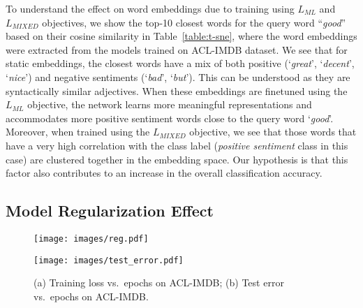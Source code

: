 \documentclass[letterpaper]{article}
\begin{document}
To understand the effect on word embeddings due to training using $L_{\textit{ML}}$ and $L_{\textit{MIXED}}$ objectives, we show the top-10 closest words for the query word ``\emph{good}'' based on their cosine similarity in Table~\ref{table:t-sne}, where the word embeddings were extracted from the models trained on ACL-IMDB dataset. We see that for static embeddings, the closest words have a mix of both positive (`\emph{great}', `\emph{decent}', `\emph{nice}') and negative sentiments (`\emph{bad}', `\emph{but}'). This can be understood as they are syntactically similar adjectives. When these embeddings are finetuned using the $L_{\textit{ML}}$ objective, the network learns more meaningful representations and accommodates more positive sentiment words close to the query word `\emph{good}'. Moreover, when trained using the $L_{\textit{MIXED}}$ objective, we see that those words that have a very high correlation with the class label (\emph{positive sentiment} class in this case) are clustered together in the embedding space. Our hypothesis is that this factor also contributes to an increase in the overall classification accuracy.

\subsection{Model Regularization Effect}
\begin{figure}[!htp]
\begin{minipage}{0.5\linewidth}
\centering
\texttt{[image: images/reg.pdf]}
\end{minipage}\begin{minipage}{0.5\linewidth}
\centering
\texttt{[image: images/test\_error.pdf]}
\end{minipage}
\caption{(a) Training loss vs.\ epochs on ACL-IMDB; (b) Test error vs.\ epochs on ACL-IMDB.}
\label{fig:reg}
\end{figure}
\end{document}

